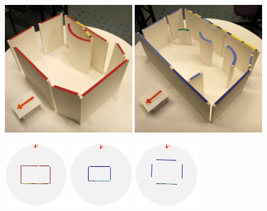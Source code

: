 \begin{figure}[t]
\begin{minipage}[c]{0.49\textwidth}
  \includegraphics[width=0.49\textwidth]{p3m_38_renovation_flipped_northarrow} %
  \includegraphics[width=0.49\textwidth]{p3m_42_renovation} %
\end{minipage}
\begin{minipage}[c]{0.5\textwidth}
  \includegraphics[width=0.24\textwidth]{p3m_0_2D_walls_rotate_edit} %
  \includegraphics[width=0.24\textwidth]{p3m_6_2D_walls_rotate} %
  \includegraphics[width=0.24\textwidth]{p3m_7_2D_walls_rotate} %

\end{minipage}
\end{figure}
